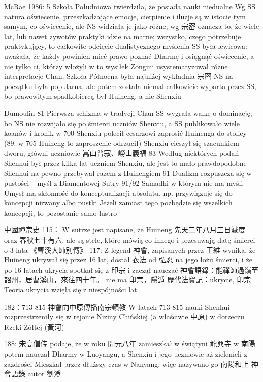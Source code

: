 McRae 1986: 5
Szkoła Południowa twierdziła, że posiada nauki niedualne
Wg SS natura oświecenie, przeszkadzające emocje, cierpienie i iluzje są w istocie tym samym, co oświecenie, ale NS widziała je jako różne; wg 宗密 oznacza to, że wiele lat, lub nawet żywotów praktyki idzie na marne; wszystko, czego potrzebuje praktykujący, to całkowite odcięcie dualistycznego myślenia
SS była lewicowa: uważała, że każdy powinien mieć prawo poznać Dharmę i osiągnąć oświecenie, a nie tylko ci, którzy włożyli w to wysiłek
Zongmi usystematyzował różne interpretacje Chan, Szkoła Północna była najniżej
wykładnia 宗密 NS na początku była popularna, ale potem została niemal całkowicie wyparta przez SS, bo prawowitym spadkobiercą był Huineng, a nie Shenxiu

Dumoulin 81
Pierwsza schizma w tradycji Chan
SS wygrała walkę o dominację, bo NS nie rozwijało się po śmierci uczniów Shenxiu, a SS publikowało wiele koanów i kronik
w 700 Shenxiu polecił cesarzowi zaprosić Huinenga do stolicy
(89: w 705 Huineng to zaproszenie odrzucił)
Shenxiu cieszył się szacunkiem dworu, główni uczniowie 嵩山普寂、嶗山義福
83
Według niektórych podań Shenhui był przez kilka lat uczniem Shenxiu, ale jest to mało prawdopodobne
Shenhui na pewno przebywał razem z Huinengiem
91 Dualizm rozpuszcza się w pustości -- myśl z Diamentowej Sutry
91/92 Samadhi w którym nie ma myśli
Umysł ma skłonność do konceptualizacji absolutu, np. przywiązuje się do koncepcji nirwany albo pustki
Jeżeli zamiast tego pozbędzie się wszelkich koncepcji, to pozostanie samo lustro

中國禪宗史 115：
W sutrze jest napisane, że Huineng 先天二年八月三日滅度 oraz 春秋七十有六, ale są stele, które mówią co innego i przesuwają datę śmierci o 3 lata
《曹溪大師別傳》
117: Z legend 神會, zapisanych przez 王維 wynika, że Huineng ukrywał się przez 16 lat, dostał 衣法 od 弘忍 na jego łożu śmierci, i że po 16 latach ukrycia spotkał się z 印宗 i zaczął nauczać
神會語錄：能禪師過嶺至韶州，居曹溪山，來往四十年。 nie ma 印宗，隱遁
歷代法寶記：ukrycie, 印宗
Teoria ukrycia wzięła się z niespójności lat

182：713-815 神會向中原傳播南宗頓教
W latach 713-815 nauki Shenhui rozprzestrzeniły się w rejonie Niziny Chińskiej (a właściwie 中原) w dorzeczu Rzeki Żółtej (黃河)

188: 宋高僧传 podaje, że w roku 開元八年 zamieszkał w świątyni 龍興寺 w 南陽
potem nauczał Dharmy w Luoyangu, a Shenxiu i jego uczniowie aż zielenieli z zazdrości
Mieszkał przez dłuższy czas w Nanyang, więc nazywano go 南陽和上
神會語錄 autor 劉澄

